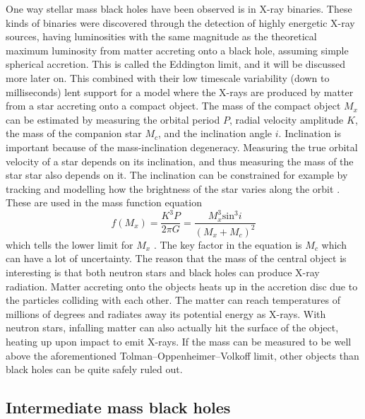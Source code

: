 \documentclass[english, oneside]{HYgradu}
\begin{document}
One way stellar mass black holes have been observed is in X-ray binaries. These kinds of binaries were discovered through the detection of highly energetic X-ray sources, having luminosities with the same magnitude as the theoretical maximum luminosity from matter accreting onto a black hole, assuming simple spherical accretion. This is called the Eddington limit, and it will be discussed more later on. This combined with their low timescale variability (down to milliseconds) lent support for a model where the X-rays are produced by matter from a star accreting onto a compact object. The mass of the compact object $M_x$ can be estimated by measuring the orbital period $P$, radial velocity amplitude $K$, the mass of the companion star $M_c$, and the inclination angle $i$. Inclination is important because of the mass-inclination degeneracy. Measuring the true orbital velocity of a star depends on its inclination, and thus measuring the mass of the star star also depends on it. The inclination can be constrained for example by tracking and modelling how the brightness of the star varies along the orbit \citep{kerkwijk:2011}. These are used in the mass function equation 
\begin{equation}
f(M_x) = \frac{K^3 P}{2 \pi G} = \frac{M_x^3 \mathrm{sin}^3 i}{(M_x + M_c)^2}
\end{equation}
which tells the lower limit for $M_x$ \citep{casares:2007}. The key factor in the equation is $M_c$ which can have a lot of uncertainty. The reason that the mass of the central object is interesting is that both neutron stars and black holes can produce X-ray radiation. Matter accreting onto the objects heats up in the accretion disc due to the particles colliding with each other. The matter can reach temperatures of millions of degrees and radiates away its potential energy as X-rays. With neutron stars, infalling matter can also actually hit the surface of the object, heating up upon impact to emit X-rays. If the mass can be measured to be well above the aforementioned Tolman–Oppenheimer–Volkoff limit, other objects than black holes can be quite safely ruled out.




\subsection{Intermediate mass black holes}
\end{document}
